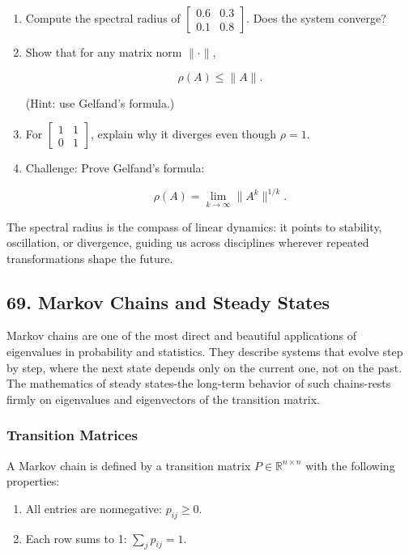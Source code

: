 \documentclass[
  letterpaper,
  DIV=11,
  numbers=noendperiod]{scrreprt}
\providecommand{\tightlist}{%
  \setlength{\itemsep}{0pt}\setlength{\parskip}{0pt}}
\begin{document}
\begin{enumerate}
\def\labelenumi{\arabic{enumi}.}
\item
  Compute the spectral radius of
  \(\begin{bmatrix} 0.6 & 0.3 \\ 0.1 & 0.8 \end{bmatrix}\). Does the
  system converge?
\item
  Show that for any matrix norm \(\|\cdot\|\),

  \[
  \rho(A) \leq \|A\|.
  \]

  (Hint: use Gelfand's formula.)
\item
  For \(\begin{bmatrix} 1 & 1 \\ 0 & 1 \end{bmatrix}\), explain why it
  diverges even though \(\rho=1\).
\item
  Challenge: Prove Gelfand's formula:

  \[
  \rho(A) = \lim_{k\to\infty} \|A^k\|^{1/k}.
  \]
\end{enumerate}

The spectral radius is the compass of linear dynamics: it points to
stability, oscillation, or divergence, guiding us across disciplines
wherever repeated transformations shape the future.

\subsection{69. Markov Chains and Steady
States}\label{markov-chains-and-steady-states}

Markov chains are one of the most direct and beautiful applications of
eigenvalues in probability and statistics. They describe systems that
evolve step by step, where the next state depends only on the current
one, not on the past. The mathematics of steady states-the long-term
behavior of such chains-rests firmly on eigenvalues and eigenvectors of
the transition matrix.

\subsubsection{Transition Matrices}\label{transition-matrices}

A Markov chain is defined by a transition matrix
\(P \in \mathbb{R}^{n \times n}\) with the following properties:

\begin{enumerate}
\def\labelenumi{\arabic{enumi}.}
\tightlist
\item
  All entries are nonnegative: \(p_{ij} \geq 0\).
\item
  Each row sums to 1: \(\sum_j p_{ij} = 1\).
\end{enumerate}
\end{document}
